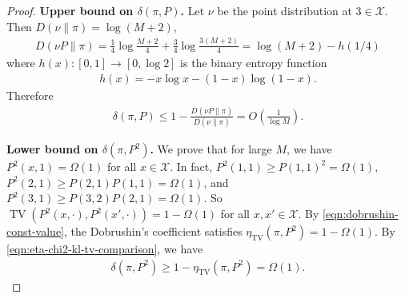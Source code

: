 \documentclass[11pt]{article}
\def\cX{\mathcal{X}}
\DeclareMathOperator\TV{\mathrm{TV}}
\theoremstyle{definition}
\begin{document}
\begin{proof}
  \textbf{Upper bound on $\delta(\pi, P)$.}
  Let $\nu$ be the point distribution at $3\in \cX$.
  Then $D(\nu \| \pi) = \log (M+2)$,
  \begin{align}
    D(\nu P \| \pi) = \frac 14 \log \frac{M+2}{4} + \frac 34 \log \frac{3(M+2)}{4} = \log (M+2) - h(1/4)
  \end{align}
  where $h(x): [0,1]\to [0,\log 2]$ is the binary entropy function
  \begin{align}
    h(x) = -x\log x - (1-x)\log (1-x).
  \end{align}
  Therefore
  \begin{align} \label{eqn:three-state-delta-P-upper-bound}
    \delta(\pi, P) \le 1-\frac{D(\nu P \| \pi)}{D(\nu \| \pi)} = O\left(\frac 1{\log M}\right).
  \end{align}

  \textbf{Lower bound on $\delta\left(\pi, P^2\right)$.}
  We prove that for large $M$, we have $P^2(x,1) = \Omega(1)$ for all $x\in \cX$.
  In fact, $P^2(1,1) \ge P(1,1)^2 = \Omega(1)$, $P^2(2,1) \ge P(2,1)P(1,1) = \Omega(1)$, and $P^2(3,1) \ge P(3,2) P(2,1) = \Omega(1)$.
  So $\TV(P^2(x,\cdot),P^2(x',\cdot)) = 1-\Omega(1)$ for all $x,x'\in \cX$.
  By \cref{eqn:dobrushin-const-value}, the Dobrushin's coefficient satisfies $\eta_{\TV}(\pi, P^2) = 1-\Omega(1)$.
  By \cref{eqn:eta-chi2-kl-tv-comparison}, we have
  \begin{align} \label{eqn:three-state-delta-PP-lower-bound}
    \delta\left(\pi, P^2\right) \ge 1-\eta_{\TV}(\pi, P^2) = \Omega(1).
  \end{align}
\end{proof}
\end{document}
